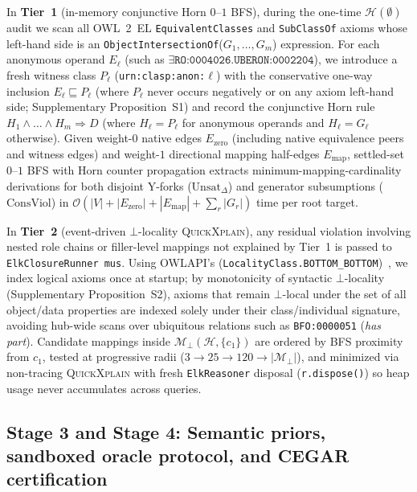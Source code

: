 \documentclass[10pt]{article}
\theoremstyle{accentdef}
\begin{document}
In \textbf{Tier~1} (in-memory conjunctive Horn $0\text{--}1$ BFS), during the one-time $\mathcal{H}(\emptyset)$ audit we scan all OWL~2~EL \texttt{EquivalentClasses} and \texttt{SubClassOf} axioms whose left-hand side is an \texttt{ObjectIntersectionOf}($G_1,\dots,G_m$) expression. For each anonymous operand $E_\ell$ (such as $\exists\texttt{RO:0004026}.\texttt{UBERON:0002204}$), we introduce a fresh witness class $P_\ell$ (\texttt{urn:clasp:anon:}$\ell$) with the conservative one-way inclusion $E_\ell \sqsubseteq P_\ell$ (where $P_\ell$ never occurs negatively or on any axiom left-hand side; Supplementary Proposition~S1) and record the conjunctive Horn rule $H_1 \wedge \dots \wedge H_m \Rightarrow D$ (where $H_\ell = P_\ell$ for anonymous operands and $H_\ell = G_\ell$ otherwise). Given weight-$0$ native edges $E_{\mathrm{zero}}$ (including native equivalence peers and witness edges) and weight-$1$ directional mapping half-edges $E_{\mathrm{map}}$, settled-set $0\text{--}1$ BFS with Horn counter propagation extracts minimum-mapping-cardinality derivations for both disjoint Y-forks ($\mathrm{Unsat}_{\Delta}$) and generator subsumptions ($\mathrm{ConsViol}$) in $\mathcal{O}(|V| + |E_{\mathrm{zero}}| + |E_{\mathrm{map}}| + \sum_r |G_r|)$ time per root target.

In \textbf{Tier~2} (event-driven $\bot$-locality \textsc{QuickXplain}), any residual violation involving nested role chains or filler-level mappings not explained by Tier~1 is passed to \texttt{ElkClosureRunner mus}. Using OWLAPI's  (\texttt{LocalityClass.BOTTOM\_BOTTOM})~\cite{cuencagrau2008modular}, we index logical axioms once at startup; by monotonicity of syntactic $\bot$-locality (Supplementary Proposition~S2), axioms that remain $\bot$-local under the set of all object/data properties are indexed solely under their class/individual signature, avoiding hub-wide scans over ubiquitous relations such as \texttt{BFO:0000051} (\emph{has part}). Candidate mappings inside $\mathcal{M}_{\bot}(\mathcal{H}, \{c_1\})$ are ordered by BFS proximity from $c_1$, tested at progressive radii ($3 \to 25 \to 120 \to |\mathcal{M}_{\bot}|$), and minimized via non-tracing \textsc{QuickXplain} with fresh \texttt{ElkReasoner} disposal (\texttt{r.dispose()}) so heap usage never accumulates across queries.

\subsection*{Stage 3 and Stage 4: Semantic priors, sandboxed oracle protocol, and CEGAR certification}
\end{document}
